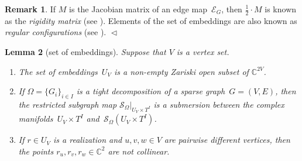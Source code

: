 \documentclass[12pt]{article}
\newtheorem{lemma}{Lemma}
\theoremstyle{definition}
\newtheorem{remark}[lemma]{Remark}
\newenvironment{claims}{\begin{enumerate}[topsep=0pt,itemsep=0pt,leftmargin=8mm,label=\textnormal{\textbf{(\alph*)}},ref=(\alph*)]}{\end{enumerate}}
\newcommand{\END}{\hfill $\vartriangleleft$}
\newcommand{\df}[1]{{\it #1}}
\newcommand{\C}{{\mathbb{C}}}
\newcommand{\cE}{\mathcal{E}}
\newcommand{\cS}{\mathcal{S}}
\begin{document}
\begin{remark}
If $M$ is the Jacobian matrix of an edge map~$\cE_G$,
then $\frac{1}{2}\cdot M$ is known as the \df{rigidity matrix}
(see \citep[.2 and ]{2019hb}).
Elements of the set of embeddings are also known as
\df{regular configurations} (see \citep[.2]{2019hb}).
\END
\end{remark}


\begin{lemma}[set of embeddings]
\label{lem:U}
Suppose that $V$ is a vertex set.
\begin{claims}
\item\label{lem:U:a}
The set of embeddings~$U_V$ is a non-empty Zariski open subset of $\C^{2V}$.
\item\label{lem:U:b}
If $\Omega=\{G_i\}_{i\in I}$ is a tight decomposition
of a sparse graph~$G=(V,E)$, then
the restricted subgraph map $\cS_\Omega|_{U_V\times T^I}$
is a submersion between the complex manifolds~$U_V\times T^I$ and~$\cS_\Omega(U_V\times T^I)$.
\item\label{lem:U:c}
If $r\in U_V$ is a realization and $u,v,w\in V$ are pairwise different vertices, then
the points $r_u,r_v,r_w\in\C^2$ are not collinear.
\end{claims}

\end{lemma}
\end{document}
